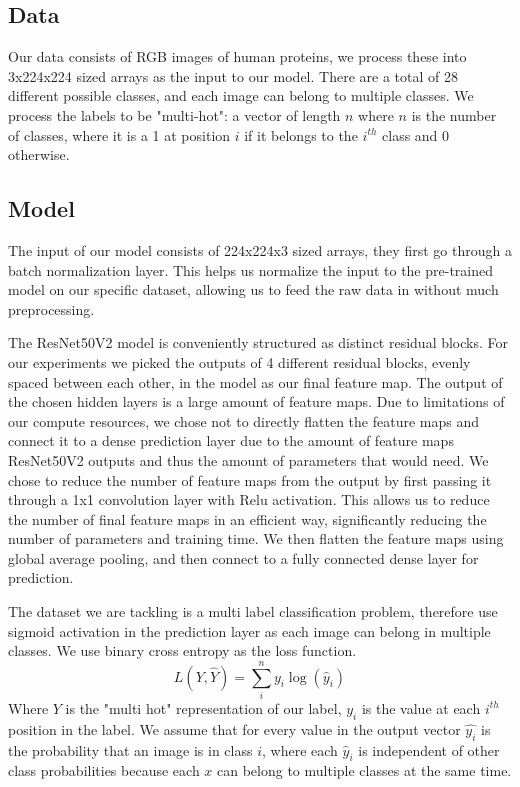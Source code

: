 \documentclass{article}
\begin{document}
\subsection{Data}
Our data consists of RGB images of human proteins, we process these into 3x224x224 sized
arrays as the input to our model. There are a total of 28 different possible classes,
and each image can belong to multiple classes. We process the labels to be "multi-hot":
a vector of length $n$ where $n$ is the number of classes, where it is a 1 at position $i$ if 
it belongs to the $i^{th}$ class and 0 otherwise.
\subsection{Model}

The input of our model consists of 224x224x3 sized arrays, they first go through a batch normalization layer\cite{ioffe2015batch}. This helps
us normalize the input to the pre-trained model on our specific dataset, allowing us 
to feed the raw data in without much preprocessing.

The ResNet50V2 model is conveniently structured as distinct residual blocks.
For our experiments we picked the outputs of 4 different residual blocks, evenly spaced between each other, in the model
as our final feature map. The output of the chosen hidden layers is a large amount of 
feature maps. Due to limitations of our compute resources, we chose not to directly flatten the feature maps and connect it to a dense prediction
layer due to the amount of feature maps ResNet50V2 outputs and thus the amount of parameters that would need. We chose to reduce the number of 
feature maps from the output by first passing it through a 1x1 convolution layer\cite{szegedy2014going} with 
Relu activation. This allows us to reduce the number of final feature maps in an efficient way, significantly reducing the number of parameters and training time. We then flatten the feature maps using global average pooling\cite{Lin2013NetworkIN}, and then connect to a 
fully connected dense layer for prediction. 

The dataset we are tackling is a multi label classification problem, therefore use sigmoid activation
in the prediction layer as each image can belong in multiple classes. We  use binary cross entropy as the loss function. 
\begin{equation}
    L(Y, \hat{Y}) = \sum_i^n y_i\log{(\hat{y}_i)}
\end{equation}
Where $Y$ is the "multi hot" representation of our label, $y_i$
is the value at each $i^{th}$ position in the label.  We assume that for every value in the output vector $\hat{y_i}$ is the probability
that an image is in class $i$, where each $\hat{y}_i$ is independent of other class probabilities because 
each $x$ can belong to multiple classes at the same time. 
\end{document}
